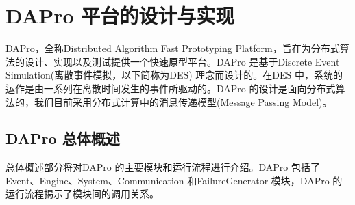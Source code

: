 \chapter{DAPro 平台的设计与实现}
    DAPro，全称Distributed Algorithm Fast Prototyping Platform，旨在为分布式算法的设计、实现以及测试提供一个快速原型平台。DAPro 是基于Discrete Event Simulation(离散事件模拟，以下简称为DES) 理念而设计的。在DES 中，系统的运作是由一系列在离散时间发生的事件所驱动的。DAPro 的设计是面向分布式算法的，我们目前采用分布式计算中的消息传递模型(Message Passing Model)。

    \section{DAPro 总体概述}
    总体概述部分将对DAPro 的主要模块和运行流程进行介绍。DAPro 包括了Event、Engine、System、Communication 和FailureGenerator 模块，DAPro 的运行流程揭示了模块间的调用关系。

